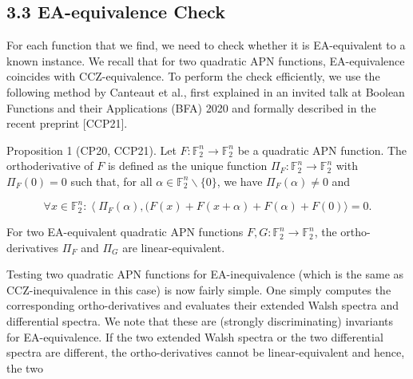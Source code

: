 \documentclass[10pt]{article}
\begin{document}
\subsection*{3.3 EA-equivalence Check}
For each function that we find, we need to check whether it is EA-equivalent to a known instance. We recall that for two quadratic APN functions, EA-equivalence coincides with CCZ-equivalence. To perform the check efficiently, we use the following method by Canteaut et al., first explained in an invited talk at Boolean Functions and their Applications (BFA) 2020 and formally described in the recent preprint [CCP21].

Proposition 1 (CP20, CCP21). Let $F: \mathbb{F}_{2}^{n} \rightarrow \mathbb{F}_{2}^{n}$ be a quadratic APN function. The orthoderivative of $F$ is defined as the unique function $\Pi_{F}: \mathbb{F}_{2}^{n} \rightarrow \mathbb{F}_{2}^{n}$ with $\Pi_{F}(0)=0$ such that, for all $\alpha \in \mathbb{F}_{2}^{n} \backslash\{0\}$, we have $\Pi_{F}(\alpha) \neq 0$ and

$$
\forall x \in \mathbb{F}_{2}^{n}:\left\langle\Pi_{F}(\alpha),(F(x)+F(x+\alpha)+F(\alpha)+F(0)\rangle=0 .\right.
$$

For two EA-equivalent quadratic APN functions $F, G: \mathbb{F}_{2}^{n} \rightarrow \mathbb{F}_{2}^{n}$, the ortho-derivatives $\Pi_{F}$ and $\Pi_{G}$ are linear-equivalent.

Testing two quadratic APN functions for EA-inequivalence (which is the same as CCZ-inequivalence in this case) is now fairly simple. One simply computes the corresponding ortho-derivatives and evaluates their extended Walsh spectra and differential spectra. We note that these are (strongly discriminating) invariants for EA-equivalence. If the two extended Walsh spectra or the two differential spectra are different, the ortho-derivatives cannot be linear-equivalent and hence, the two
\end{document}
